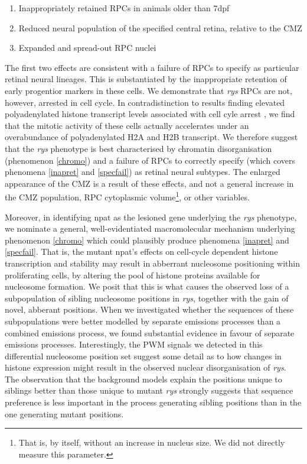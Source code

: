 \begin{enumerate}
\item\label{inapret} Inappropriately retained RPCs in animals older than 7dpf
\item\label{specfail} Reduced neural population of the specified central retina, relative to the CMZ
\item\label{chromo} Expanded and spread-out RPC nuclei
\end{enumerate}

The first two effects are consistent with a failure of RPCs to specify as particular retinal neural lineages. This is substantiated by the inappropriate retention of early progentior markers in these cells. We demonstrate that \textit{rys} RPCs are not, however, arrested in cell cycle. In contradistinction to results finding elevated polyadenylated histone transcript levels associated with cell cyle arrest \cite{Kari2013}, we find that the mitotic activity of these cells actually accelerates under an overabundance of polyadenylated H2A and H2B transcript. We therefore suggest that the \textit{rys} phenotype is best characterised by chromatin disorganisation (phenomenon \ref{chromo}) and a failure of RPCs to correctly specify (which covers phenomena \ref{inapret} and \ref{specfail}) as retinal neural subtypes. The enlarged appearance of the CMZ is a result of these effects, and not a general increase in the CMZ population, RPC cytoplasmic volume\footnote{That is, by itself, without an increase in nucleus size. We did not directly measure this parameter.}, or other variables. 

Moreover, in identifying npat as the lesioned gene underlying the \textit{rys} phenotype, we nominate a general, well-evidentiated macromolecular mechanism underlying phenomenon \ref{chromo} which could plausibly produce phenomena \ref{inapret} and \ref{specfail}. That is, the mutant npat's effects on cell-cycle dependent histone transcription and stability may result in abberrant nucleosome positioning within proliferating cells, by altering the pool of histone proteins available for nucleosome formation. We posit that this is what causes the observed loss of a subpopulation of sibling nucleosome positions in \textit{rys}, together with the gain of novel, abberant positions. When we investigated whether the sequences of these subpopulations were better modelled by separate emissions processes than a combined emissions process, we found substantial evidence in favour of separate emissions processes. Interestingly, the PWM signals we detected in this differential nucleosome position set suggest some detail as to how changes in histone expression might result in the observed nuclear disorganisation of \textit{rys}. The observation that the background models explain the positions unique to siblings better than those unique to mutant \textit{rys} strongly suggests that sequence preference is less important in the process generating sibling positions than in the one generating mutant positions.

